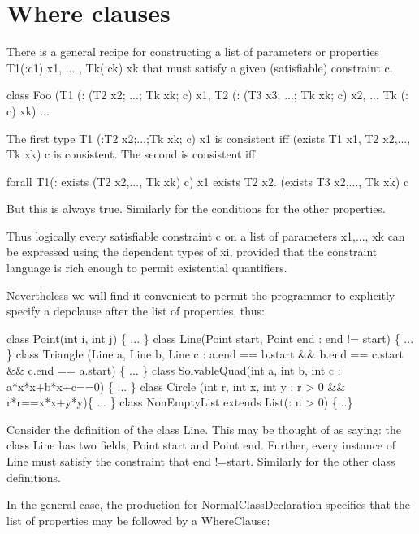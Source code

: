 \section{Where clauses}\label{DepType:WhereClauses}

There is a general recipe for constructing a list of parameters or
properties {\cf T1(:c1) x1, ... , Tk(:ck) xk} that must satisfy a given
(satisfiable) constraint {\cf c}. 

\begin{x10}
class Foo (T1 (: (T2 x2; ...; Tk xk;  c) x1, 
       T2 (: (T3 x3; ...; Tk xk;  c) x2, 
        ...
       Tk (:  c) xk) { 
 ...
}
\end{x10}

The first type {\cf T1 (:T2 x2;...;Tk xk; c) x1} is consistent iff
{\cf (exists T1 x1, T2 x2,..., Tk xk) c} is consistent. The second is
consistent iff
\begin{x10}
forall T1(: exists (T2 x2,..., Tk xk) c) x1
exists T2 x2. (exists T3 x2,..., Tk xk) c
\end{x10}
\noindent But this is always true. Similarly for the conditions for the other
properties.

Thus logically every satisfiable constraint {\cf c} on a list of parameters
{\cf x1,..., xk} can be expressed using the dependent types of xi, provided
that the constraint language is rich enough to permit existential
quantifiers.

Nevertheless we will find it convenient to permit the programmer to
explicitly specify a depclause after the list of properties, thus:
\begin{x10}
class Point(int i, int j) \{ ... \}
class Line(Point start, Point end :  end != start) 
  \{ ... \}
class Triangle (Line a, Line b, Line c 
       : a.end == b.start \&\& b.end == c.start \&\&
         c.end == a.start) \{ ... \}
class SolvableQuad(int a, int b, int c 
                   : a*x*x+b*x+c==0)  \{ ... \}
class Circle (int r, int x, int y 
              : r > 0 \&\& r*r==x*x+y*y)\{ ... \}
class NonEmptyList extends List(: n > 0) \{...\}
\end{x10}

Consider the definition of the class {\cf Line}. This may be thought of as
saying: the class {\cf Line} has two fields, {\cf Point start} and {\cf Point
end}. Further, every instance of Line must satisfy the constraint that
{\cf end !=start}. Similarly for the other class definitions. 

In the general case, the production for {\cf NormalClassDeclaration}
specifies that the list of properties may be followed by a {\cf
WhereClause}:

